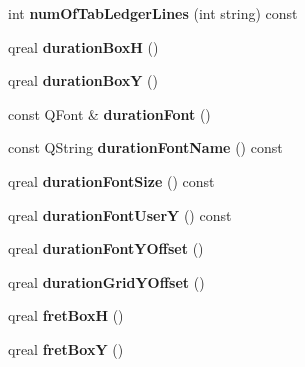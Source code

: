 \begin{DoxyCompactItemize}
\item 
\mbox{\label{class_ms_1_1_staff_type_afe64864ef4d506a2f678f3a130b09f71}} 
int {\bfseries num\+Of\+Tab\+Ledger\+Lines} (int string) const
\item 
\mbox{\label{class_ms_1_1_staff_type_af045af96f7178d119493cc3cdb6f6239}} 
qreal {\bfseries duration\+BoxH} ()
\item 
\mbox{\label{class_ms_1_1_staff_type_a6d42aa73b039fbcbafcc414ddca7c8ba}} 
qreal {\bfseries duration\+BoxY} ()
\item 
\mbox{\label{class_ms_1_1_staff_type_af272849ffaa2019a073603ad7552cc64}} 
const Q\+Font \& {\bfseries duration\+Font} ()
\item 
\mbox{\label{class_ms_1_1_staff_type_a4854ebd0df4d63618bb88c1e65b8830a}} 
const Q\+String {\bfseries duration\+Font\+Name} () const
\item 
\mbox{\label{class_ms_1_1_staff_type_a39677019ec88762ed23b340ec834e4c8}} 
qreal {\bfseries duration\+Font\+Size} () const
\item 
\mbox{\label{class_ms_1_1_staff_type_a2441e6406a5f2726a519cc3c91eb95c6}} 
qreal {\bfseries duration\+Font\+UserY} () const
\item 
\mbox{\label{class_ms_1_1_staff_type_a81fd904a28001f8015c2a17a40e34680}} 
qreal {\bfseries duration\+Font\+Y\+Offset} ()
\item 
\mbox{\label{class_ms_1_1_staff_type_a10a3dd099ea80e5b378be78db9b11e59}} 
qreal {\bfseries duration\+Grid\+Y\+Offset} ()
\item 
\mbox{\label{class_ms_1_1_staff_type_a153627aadb8bec79fb91d828f2d9364b}} 
qreal {\bfseries fret\+BoxH} ()
\item 
\mbox{\label{class_ms_1_1_staff_type_a87ed51c67eb848c4d3978ddb99b3d71f}} 
qreal {\bfseries fret\+BoxY} ()

\end{DoxyCompactItemize}
